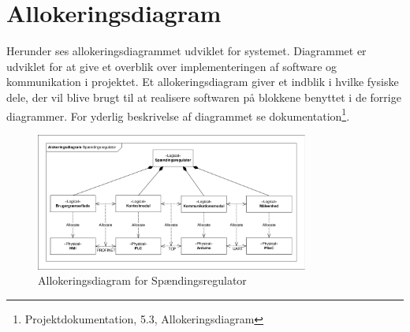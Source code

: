 

\section{Allokeringsdiagram}

Herunder ses allokeringsdiagrammet udviklet for systemet. Diagrammet er udviklet for at give et overblik over implementeringen af software og kommunikation i projektet. Et allokeringsdiagram giver et indblik i hvilke fysiske dele, der vil blive brugt til at realisere softwaren på blokkene benyttet i de forrige diagrammer. For yderlig beskrivelse af diagrammet se dokumentation\footnote{Projektdokumentation, 5.3, Allokeringsdiagram}.


\begin{figure}[htbp] %
	\centering
	\includegraphics[width=0.8\textwidth]{figure/Allokering.pdf}
	\caption{Allokeringsdiagram for Spændingsregulator}
	\label{fig:Allokering}
\end{figure}